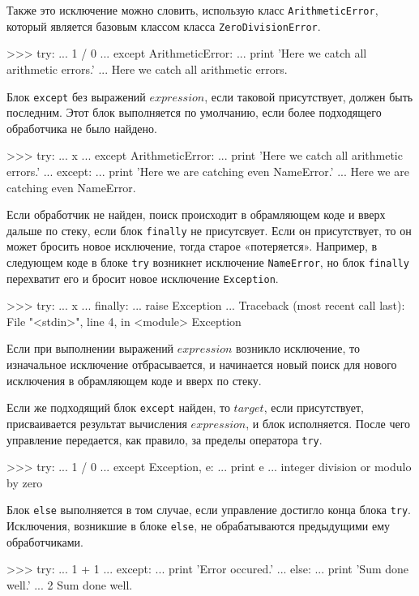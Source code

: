 Также это исключение можно словить, использую класс \lstinline{ArithmeticError}, который является базовым классом класса \lstinline{ZeroDivisionError}.
\begin{pylst}{}{}
>>> try:
...     1 / 0
... except ArithmeticError:
...     print 'Here we catch all arithmetic errors.'
...
Here we catch all arithmetic errors.
\end{pylst}

Блок \lstinline{except} без выражений $expression$, если таковой присутствует, должен быть последним. Этот блок выполняется по умолчанию, если более подходящего обработчика не было найдено.
\begin{pylst}{}{}
>>> try:
...     x
... except ArithmeticError:
...     print 'Here we catch all arithmetic errors.'
... except:
...     print 'Here we are catching even NameError.'
...
Here we are catching even NameError.
\end{pylst}

Если обработчик не найден, поиск происходит в обрамляющем коде и вверх дальше по стеку, если блок \lstinline{finally} не присутсвует. Если он присутствует, то он может бросить новое исключение, тогда старое «потеряется». Например, в следующем коде в блоке \lstinline{try} возникнет исключение \lstinline{NameError}, но блок \lstinline{finally} перехватит его и бросит новое исключение \lstinline{Exception}.
\begin{pylst}{}{}
>>> try:
...     x
... finally:
...     raise Exception
...
Traceback (most recent call last):
  File "<stdin>", line 4, in <module>
Exception
\end{pylst}

Если при выполнении выражений $expression$ возникло исключение, то изначальное исключение отбрасывается, и начинается новый поиск для нового исключения в обрамляющем коде и вверх по стеку.

Если же подходящий блок \lstinline{except} найден, то $target$, если присутствует, присваивается результат вычисления $expression$, и блок исполняется. После чего управление передается, как правило, за пределы оператора \lstinline{try}.
\begin{pylst}{}{}
>>> try:
...     1 / 0
... except Exception, e:
...     print e
...
integer division or modulo by zero
\end{pylst}

Блок \lstinline{else} выполняется в том случае, если управление достигло конца блока \lstinline{try}. Исключения, возникшие в блоке \lstinline{else}, не обрабатываются предыдущими ему обработчиками.
\begin{pylst}{}{}
>>> try:
...     1 + 1
... except:
...     print 'Error occured.'
... else:
...     print 'Sum done well.'
...
2
Sum done well.
\end{pylst}

